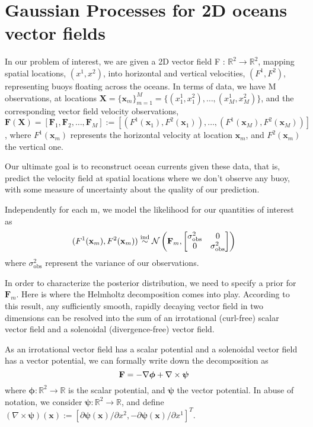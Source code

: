 \documentclass[11pt,a4paper]{article}
\begin{document}
\section*{Gaussian Processes for 2D oceans vector fields}

In our problem of interest, we are given a 2D vector field F : $ \mathbb{R}^2 \rightarrow \mathbb{R}^2$, mapping spatial locations, $(x^1,x^2)$, into horizontal and vertical velocities, $(F^1,F^2)$, representing buoys floating across the oceans. In terms of data, we have M observations, at locations $\textbf{X} = \{\textbf{x}_m\}_{m=1}^M = \{(x_1^1, x_1^2), \ldots, (x_M^1, x_M^2)\}$, and the corresponding vector field velocity observations, $\textbf{F}(\textbf{X}) = [\textbf{F}_1, \textbf{F}_2, \ldots, \textbf{F}_M] := [(F^1(\textbf{x}_1), F^2(\textbf{x}_1)), \ldots,  (F^1(\textbf{x}_M), F^2(\textbf{x}_M))]$, where $F^1(\textbf{x}_m)$ represents the horizontal velocity at location $\textbf{x}_m$, and $F^2(\textbf{x}_m)$ the vertical one. 


Our ultimate goal is to reconstruct ocean currents given these data, that is, predict the velocity field at spatial locations where we don't observe any buoy, with some measure of uncertainty about the quality of our prediction. 

Independently for each m, we model the likelihood for our quantities of interest as
$$
(F^1(\textbf{x}_m), F^2(\textbf{x}_m)) \stackrel{\text{ind}}{\sim} \mathcal{N}\left(\text{\textbf{F}}_m, \begin{bmatrix}
\sigma^2_{\text{obs}} & 0 \\ 0 & \sigma^2_{\text{obs}}
\end{bmatrix} \right)
$$
where $\sigma^2_{\text{obs}}$ represent the variance of our observations.

In order to characterize the posterior distribution, we need to specify a prior for $\textbf{F}_m$. Here is where the Helmholtz decomposition comes into play. According to this result, any sufficiently smooth, rapidly decaying vector field in two dimensions can be resolved into the sum of an irrotational (curl-free) scalar vector field and a solenoidal (divergence-free) vector field. 

As an irrotational vector field has a scalar potential and a solenoidal vector field has a vector potential, we can formally write down the decomposition as 
$$
 \text{\textbf{F}} = -\nabla \bm{\phi} +\nabla \times \bm{\psi}
$$
 where $\bm{\phi} : \mathbb{R}^2 \rightarrow \mathbb{R}$ is the scalar potential, and $\bm{\psi}$ the vector potential. In abuse of notation, we consider $\bm{\psi} : \mathbb{R}^2 \rightarrow \mathbb{R}$, and define $(\nabla \times \bm{\psi})(\textbf{x}) := [\partial \bm{\psi}(\textbf{x}) / \partial x^2, -\partial \bm{\psi}(\textbf{x}) / \partial x^1]^T$.
 
\end{document}
